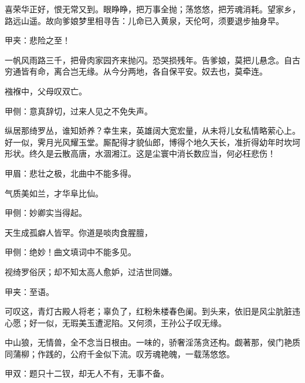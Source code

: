 \begin{qute}
    喜荣华正好，恨无常又到。眼睁睁，把万事全抛；荡悠悠，把芳魂消耗。望家乡，路远山遥。故向爹娘梦里相寻告：儿命已入黄泉，天伦呵，须要退步抽身早。\begin{note}甲夹：悲险之至！\end{note}
\end{qute}


\begin{qute}
    一帆风雨路三千，把骨肉家园齐来抛闪。恐哭损残年。告爹娘，莫把儿悬念。自古穷通皆有命，离合岂无缘。从今分两地，各自保平安。奴去也，莫牵连。
\end{qute}


\begin{qute}
    襁褓中，父母叹双亡。\begin{note}甲侧：意真辞切，过来人见之不免失声。\end{note}纵居那绮罗丛，谁知娇养？幸生来，英雄阔大宽宏量，从未将儿女私情略萦心上。好一似，霁月光风耀玉堂。厮配得才貌仙郎，博得个地久天长，准折得幼年时坎坷形状。终久是云散高唐，水涸湘江。这是尘寰中消长数应当，何必枉悲伤！\begin{note}甲眉：悲壮之极，北曲中不能多得。\end{note}
\end{qute}


\begin{qute}
    气质美如兰，才华阜比仙。\begin{note}甲侧：妙卿实当得起。\end{note}天生成孤癖人皆罕。你道是啖肉食腥膻，\begin{note}甲侧：绝妙！曲文填词中不能多见。\end{note}视绮罗俗厌；却不知太高人愈妒，过洁世同嫌。\begin{note}甲夹：至语。\end{note}可叹这，青灯古殿人将老；辜负了，红粉朱楼春色阑。到头来，依旧是风尘肮脏违心愿；好一似，无瑕美玉遭泥陷。又何须，王孙公子叹无缘。
\end{qute}


\begin{qute}
    中山狼，无情兽，全不念当日根由。一味的，骄奢淫荡贪还构。觑著那，侯门艳质同蒲柳；作践的，公府千金似下流。叹芳魂艳魄，一载荡悠悠。\begin{note}甲双：题只十二钗，却无人不有，无事不备。\end{note}
\end{qute}



